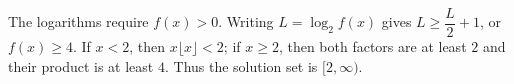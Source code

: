 The logarithms require $f(x)>0$. Writing $L=\log_2f(x)$ gives $L\ge \dfrac{L}{2}+1$, or $f(x)\ge4$. If $x<2$, then $x\lfloor x\rfloor<2$; if $x\ge2$, then both factors are at least $2$ and their product is at least $4$. Thus the solution set is $\boxed{[2,\infty)}$.

